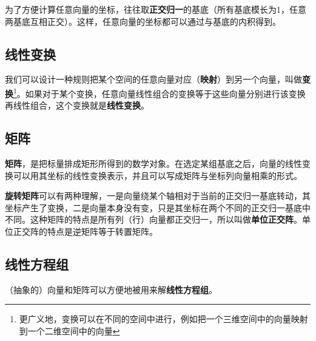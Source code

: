 为了方便计算任意向量的坐标，往往取\textbf{正交归一}的基底（所有基底模长为1，任意两基底互相正交）。这样，任意向量的坐标都可以通过与基底的内积得到。

\subsection{线性变换}

我们可以设计一种规则把某个空间的任意向量对应（\textbf{映射}）到另一个向量，叫做\textbf{变换}\footnote{更广义地，变换可以在不同的空间中进行，例如把一个三维空间中的向量映射到一个二维空间中的向量}。如果对于某个变换，任意向量线性组合的变换等于这些向量分别进行该变换再线性组合，这个变换就是\textbf{线性变换}。

\subsection{矩阵}

\textbf{矩阵}，是把标量排成矩形所得到的数学对象。在选定某组基底之后，向量的线性变换可以用其坐标的线性变换表示，并且可以写成矩阵与坐标列向量相乘的形式。


\textbf{旋转矩阵}可以有两种理解，一是向量绕某个轴相对于当前的正交归一基底转动，其坐标产生了变换，二是向量本身没有变，只是其坐标在两个不同的正交归一基底中不同。这种矩阵的特点是所有列（行）向量都正交归一，所以叫做\textbf{单位正交阵}。单位正交阵的特点是逆矩阵等于转置矩阵。






\subsection{线性方程组}

（抽象的）向量和矩阵可以方便地被用来解\textbf{线性方程组}。
